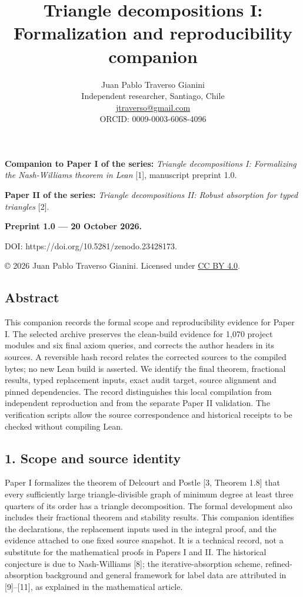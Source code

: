 \documentclass[english,11pt,a4paper]{article}
\title{Triangle decompositions I: Formalization and reproducibility companion}
\author{Juan Pablo Traverso Gianini\\
\small Independent researcher, Santiago, Chile\\
\small \href{mailto:jtraverso@gmail.com}{jtraverso@gmail.com}\\
\small ORCID: 0009-0003-6068-4096}
\date{}
\begin{document}
\raggedbottom
\maketitle
\textbf{Companion to Paper I of the series:} \emph{Triangle decompositions I: Formalizing the Nash-Williams theorem in Lean} {[}1{]}, manuscript preprint 1.0.

\textbf{Paper II of the series:} \emph{Triangle decompositions II: Robust absorption for typed triangles} {[}2{]}.

\textbf{Preprint 1.0 --- 20 October 2026.}

DOI: https://doi.org/10.5281/zenodo.23428173.

© 2026 Juan Pablo Traverso Gianini. Licensed under \href{https://creativecommons.org/licenses/by/4.0/}{CC BY 4.0}.

\subsection{Abstract}\label{abstract}

This companion records the formal scope and reproducibility evidence for Paper I. The selected archive preserves the clean-build evidence for 1,070 project modules and six final axiom queries, and corrects the author headers in its sources. A reversible hash record relates the corrected sources to the compiled bytes; no new Lean build is asserted. We identify the final theorem, fractional results, typed replacement inputs, exact audit target, source alignment and pinned dependencies. The record distinguishes this local compilation from independent reproduction and from the separate Paper II validation. The verification scripts allow the source correspondence and historical receipts to be checked without compiling Lean.

\subsection{1. Scope and source identity}\label{scope-and-source-identity}

Paper I formalizes the theorem of Delcourt and Postle {[}3, Theorem 1.8{]} that every sufficiently large triangle-divisible graph of minimum degree at least three quarters of its order has a triangle decomposition. The formal development also includes their fractional theorem and stability results. This companion identifies the declarations, the replacement inputs used in the integral proof, and the evidence attached to one fixed source snapshot. It is a technical record, not a substitute for the mathematical proofs in Papers I and II. The historical conjecture is due to Nash-Williams {[}8{]}; the iterative-absorption scheme, refined-absorption background and general framework for label data are attributed in {[}9{]}--{[}11{]}, as explained in the mathematical article.
\end{document}
